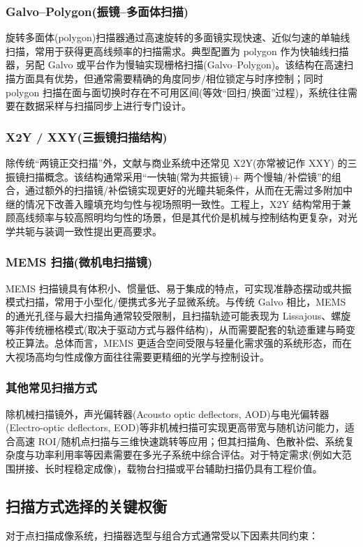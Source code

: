 \subsubsection{Galvo–Polygon(振镜–多面体扫描)}
旋转多面体(polygon)扫描器通过高速旋转的多面镜实现快速、近似匀速的单轴线扫描，常用于获得更高线频率的扫描需求。典型配置为 polygon 作为快轴线扫描器，另配 Galvo 或平台作为慢轴实现栅格扫描(Galvo–Polygon)。该结构在高速扫描方面具有优势，但通常需要精确的角度同步/相位锁定与时序控制；同时 polygon 扫描在面与面切换时存在不可用区间(等效``回扫/换面''过程)，系统往往需要在数据采样与扫描同步上进行专门设计。

\subsubsection{X2Y / XXY(三振镜扫描结构)}
除传统``两镜正交扫描''外，文献与商业系统中还常见 X2Y(亦常被记作 XXY) 的三振镜扫描概念。该结构通常采用``一快轴(常为共振镜)+ 两个慢轴/补偿镜''的组合\cite{RN1325}，通过额外的扫描镜/补偿镜实现更好的光瞳共轭条件，从而在无需过多附加中继的情况下改善入瞳填充均匀性与视场照明一致性。工程上，X2Y 结构常用于兼顾高线频率与较高照明均匀性的场景，但是其代价是机械与控制结构更复杂，对光学共轭与装调一致性提出更高要求。

\subsubsection{MEMS 扫描(微机电扫描镜)}
MEMS 扫描镜具有体积小、惯量低、易于集成的特点，可实现准静态摆动或共振模式扫描，常用于小型化/便携式多光子显微系统。与传统 Galvo 相比，MEMS 的通光孔径与最大扫描角通常较受限制，且扫描轨迹可能表现为 Lissajous、螺旋等非传统栅格模式(取决于驱动方式与器件结构)，从而需要配套的轨迹重建与畸变校正算法。总体而言，MEMS 更适合空间受限与轻量化需求强的系统形态，而在大视场高均匀性成像方面往往需要更精细的光学与控制设计。

\subsubsection{其他常见扫描方式}
除机械扫描镜外，声光偏转器(Acousto optic deflectors, AOD)与电光偏转器(Electro-optic deflectors, EOD)等非机械扫描可实现更高带宽与随机访问能力，适合高速 ROI/随机点扫描与三维快速跳转等应用；但其扫描角、色散补偿、系统复杂度与功率利用率等因素需要在多光子系统中综合评估。对于特定需求(例如大范围拼接、长时程稳定成像)，载物台扫描或平台辅助扫描仍具有工程价值。



\subsection{扫描方式选择的关键权衡}\label{2.3.3}
对于点扫描成像系统，扫描器选型与组合方式通常受以下因素共同约束：


